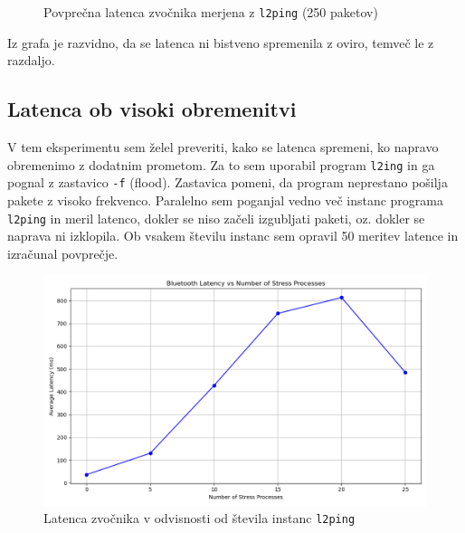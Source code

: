\documentclass[11pt,a4paper,slovene]{article}
\begin{document}
\begin{figure}[H]
\centering
{}
\caption{Povprečna latenca zvočnika merjena z \texttt{l2ping} (250 paketov)}
\end{figure}

Iz grafa je razvidno, da se latenca ni bistveno spremenila z oviro, temveč le z razdaljo.

\subsection{Latenca ob visoki obremenitvi}

V tem eksperimentu sem želel preveriti, kako se latenca spremeni, ko napravo obremenimo z dodatnim prometom. Za to sem uporabil program \texttt{l2ing} in ga pognal z zastavico \texttt{-f} (flood). Zastavica pomeni, da program neprestano pošilja pakete z visoko frekvenco. Paralelno sem poganjal vedno več instanc programa \texttt{l2ping} in meril latenco, dokler se niso začeli izgubljati paketi, oz. dokler se naprava ni izklopila. Ob vsakem številu instanc sem opravil 50 meritev latence in izračunal povprečje.

\begin{figure}[H]
    \centering
    \includegraphics[width=1\textwidth]{images/speaker_stress_latency_25.png}
    \caption{Latenca zvočnika v odvisnosti od števila instanc \texttt{l2ping}}
    \label{fig:speaker_stress_latency}
\end{figure}
\end{document}
